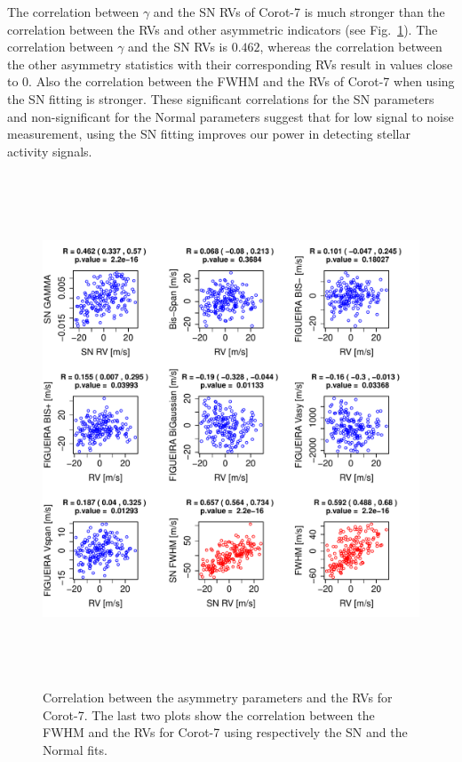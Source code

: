 \documentclass[11pt, oneside]{article}
\begin{document}
The correlation between $\gamma$ and the SN RVs of Corot-7 is much stronger than the correlation between  the RVs and other asymmetric indicators (see Fig.~\ref{fig:Corot7:corrPlot}). The correlation between $\gamma$ and the SN RVs is $0.462$, whereas the correlation between the other asymmetry statistics with their corresponding RVs result in values close to $0$. Also the correlation between the FWHM and the RVs of Corot-7 when using the SN fitting is stronger. These significant correlations for the SN parameters and non-significant for the Normal parameters suggest that for low signal to noise measurement, using the SN fitting improves our power in detecting stellar activity signals. 
%
\begin{figure}[htbp]
   \centering
\includegraphics[height = 6in]{LRa01_E_[4]Comparison_para.pdf} 
   \caption{Correlation between the asymmetry parameters and the RVs for Corot-7. The last two plots show the correlation between the FWHM and the RVs for Corot-7 using respectively the SN and the Normal fits.}
   \label{fig:Corot7:corrPlot}
\end{figure}

\end{document}
